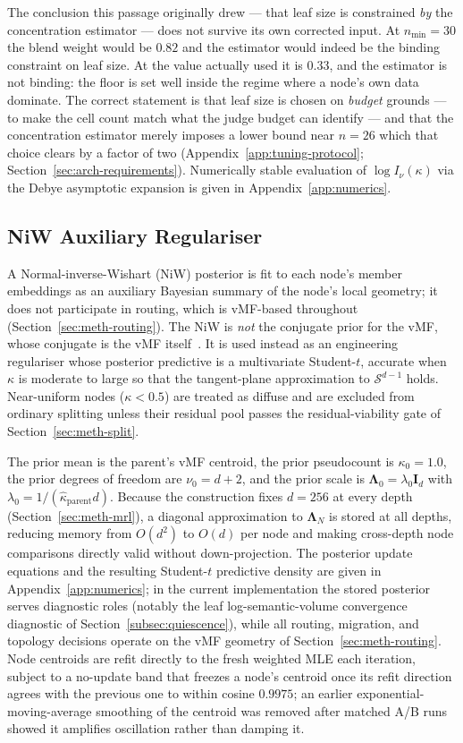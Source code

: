 The conclusion this passage originally drew --- that leaf size is
constrained \emph{by} the concentration estimator --- does not survive
its own corrected input. At $n_{\min} = 30$ the blend weight would be
$0.82$ and the estimator would indeed be the binding constraint on leaf
size. At the value actually used it is $0.33$, and the estimator is not
binding: the floor is set well inside the regime where a node's own
data dominate. The correct statement is that leaf size is chosen on
\emph{budget} grounds --- to make the cell count match what the judge
budget can identify --- and that the concentration estimator merely
imposes a lower bound near $n = 26$ which that choice clears by a
factor of two (Appendix~\ref{app:tuning-protocol};
Section~\ref{sec:arch-requirements}).
Numerically stable evaluation of $\log I_\nu(\kappa)$ via the Debye
asymptotic expansion is given in Appendix~\ref{app:numerics}.

\subsection{NiW Auxiliary Regulariser}

A Normal-inverse-Wishart (NiW) posterior is fit to each node's member
embeddings as an auxiliary Bayesian summary of the node's local
geometry; it does not participate in routing, which is vMF-based
throughout (Section~\ref{sec:meth-routing}).
The NiW is \textit{not} the conjugate prior for the vMF, whose
conjugate is the vMF itself~\parencite{gopal2014mises}. It is used
instead as an engineering regulariser whose posterior predictive is a
multivariate Student-$t$, accurate when $\kappa$ is moderate to large
so that the tangent-plane approximation to $\mathcal{S}^{d-1}$ holds.
Near-uniform nodes ($\kappa < 0.5$) are treated as diffuse and are
excluded from ordinary splitting unless their residual pool passes
the residual-viability gate of Section~\ref{sec:meth-split}.

The prior mean is the parent's vMF centroid, the prior pseudocount is
$\kappa_0 = 1.0$, the prior degrees of freedom are
$\nu_0 = d + 2$, and the prior scale is
$\boldsymbol{\Lambda}_0 = \lambda_0 \mathbf{I}_{d}$ with
$\lambda_0 = 1/(\hat{\kappa}_{\text{parent}} d)$.
Because the construction fixes $d = 256$ at every depth
(Section~\ref{sec:meth-mrl}), a diagonal approximation to
$\boldsymbol{\Lambda}_N$ is stored at all depths, reducing memory from
$O(d^2)$ to $O(d)$ per node and making cross-depth node comparisons
directly valid without down-projection.
The posterior update equations and the resulting Student-$t$
predictive density are given in Appendix~\ref{app:numerics}; in the
current implementation the stored posterior serves diagnostic roles
(notably the leaf log-semantic-volume convergence diagnostic of
Section~\ref{subsec:quiescence}), while all routing, migration, and
topology decisions operate on the vMF geometry of
Section~\ref{sec:meth-routing}.
Node centroids are refit directly to the fresh weighted MLE each
iteration, subject to a no-update band that freezes a node's centroid
once its refit direction agrees with the previous one to within
cosine $0.9975$; an earlier exponential-moving-average smoothing of
the centroid was removed after matched A/B runs showed it amplifies
oscillation rather than damping it.


